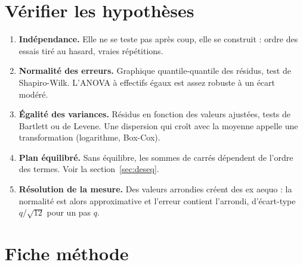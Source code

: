 \documentclass[11pt,a4paper]{article}
\theoremstyle{sj}
\theoremstyle{definition}
\theoremstyle{remark}
\begin{document}
\section{Vérifier les hypothèses}\label{sec:hyp}

\begin{enumerate}[leftmargin=1.4em]
\item \textbf{Indépendance.} Elle ne se teste pas après coup, elle se construit : ordre des essais tiré au hasard, vraies répétitions.
\item \textbf{Normalité des erreurs.} Graphique quantile-quantile des résidus, test de Shapiro-Wilk. L'ANOVA à effectifs égaux est assez robuste à un écart modéré.
\item \textbf{Égalité des variances.} Résidus en fonction des valeurs ajustées, tests de Bartlett ou de Levene. Une dispersion qui croît avec la moyenne appelle une transformation (logarithme, Box-Cox).
\item \textbf{Plan équilibré.} Sans équilibre, les sommes de carrés dépendent de l'ordre des termes. Voir la section~\ref{sec:deseq}.
\item \textbf{Résolution de la mesure.} Des valeurs arrondies créent des ex aequo : la normalité est alors approximative et l'erreur contient l'arrondi, d'écart-type $q/\sqrt{12}$ pour un pas $q$.
\end{enumerate}

\section{Fiche méthode}\label{sec:fiche}
\end{document}
